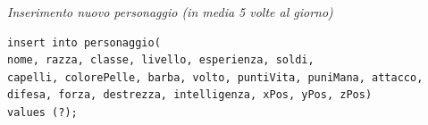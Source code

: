 \noindent{}
\newline\newline

\noindent\textit{Inserimento nuovo personaggio (in media 5 volte al giorno)}
\begin{verbatim}insert into personaggio(
nome, razza, classe, livello, esperienza, soldi,
capelli, colorePelle, barba, volto, puntiVita, puniMana, attacco,
difesa, forza, destrezza, intelligenza, xPos, yPos, zPos)
values (?);

\end{verbatim}
